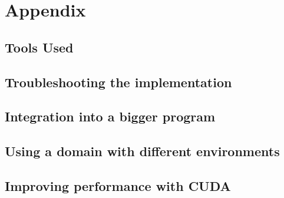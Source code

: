 
\chapter{Appendix} %

\label{AppendixA} %

\section{Tools Used}

\section{Troubleshooting the implementation}

\section{Integration into a bigger program}

\section{Using a domain with different environments}

\section{Improving performance with CUDA}

